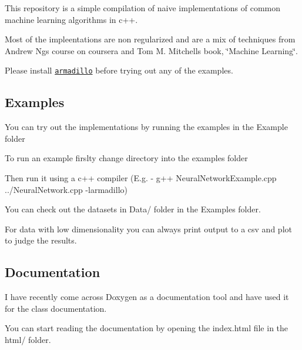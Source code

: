 This repository is a simple compilation of naive implementations of common machine learning algorithms in c++.

Most of the impleentations are non regularized and are a mix of techniques from Andrew Ng\textquotesingle{}s course on coursera and Tom M. Mitchell\textquotesingle{}s book, \char`\"{}\+Machine Learning\char`\"{}.

Please install \href{http://arma.sourceforge.net/}{\tt armadillo} before trying out any of the examples.

\subsection*{Examples}


\begin{DoxyItemize}
\item You can try out the implementations by running the examples in the Example folder
\begin{DoxyEnumerate}
\item To run an example firslty change directory into the examples folder
\item Then run it using a c++ compiler (E.\+g. -\/ g++ Neural\+Network\+Example.\+cpp ../\+Neural\+Network.cpp -\/larmadillo)
\end{DoxyEnumerate}
\item You can check out the datasets in Data/ folder in the Examples folder.
\item For data with low dimensionality you can always print output to a csv and plot to judge the results.
\end{DoxyItemize}

\subsection*{Documentation}


\begin{DoxyItemize}
\item I have recently come across Doxygen as a documentation tool and have used it for the class documentation.
\item You can start reading the documentation by opening the index.\+html file in the html/ folder. 
\end{DoxyItemize}